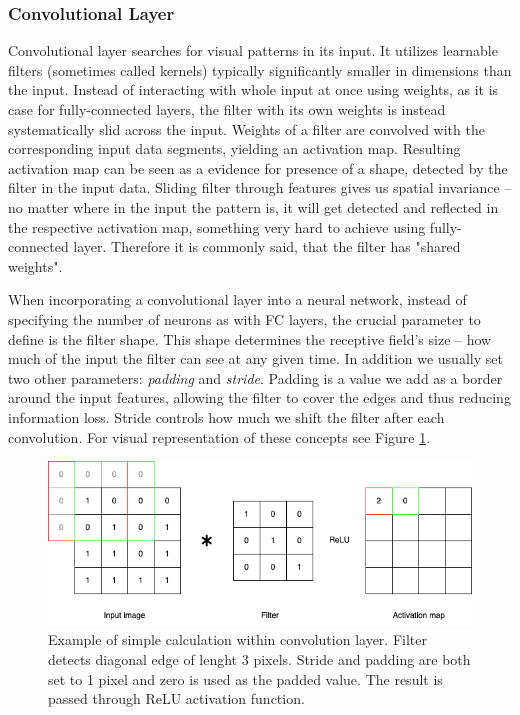 
\subsubsection{Convolutional Layer}

Convolutional layer searches for visual patterns in its input. It utilizes learnable filters (sometimes called kernels) typically significantly smaller in dimensions than the input. Instead of interacting with whole input at once using weights, as it is case for fully-connected layers, the filter with its own weights is instead systematically slid across the input. Weights of a filter are convolved with the corresponding input data segments, yielding an activation map. Resulting activation map can be seen as a evidence for presence of a shape, detected by the filter in the input data. Sliding filter through features gives us spatial invariance -- no matter where in the input the pattern is, it will get detected and reflected in the respective activation map, something very hard to achieve using fully-connected layer. Therefore it is commonly said, that the filter has "shared weights".

When incorporating a convolutional layer into a neural network, instead of specifying the number of neurons as with FC layers, the crucial parameter to define is the filter shape. This shape determines the receptive field's size -- how much of the input the filter can see at any given time. In addition we usually set two other parameters: \emph{padding} and \emph{stride}. Padding is a value we add as a border around the input features, allowing the filter to cover the edges and thus reducing information loss. Stride controls how much we shift the filter after each convolution. For visual representation of these concepts see Figure \ref{fig:cnn-convolution}.


\begin{figure}[!h]
    \begin{center}
    \begin{minipage}{0.75\textwidth}
      \includegraphics[width=\textwidth]{img/cnn-conv.png}
    \end{minipage}
    \caption{Example of simple calculation within convolution layer. Filter detects diagonal edge of lenght 3 pixels. Stride and padding are both set to 1 pixel and zero is used as the padded value. The result is passed through ReLU activation function.}
    \label{fig:cnn-convolution}
    \end{center}
\end{figure}

